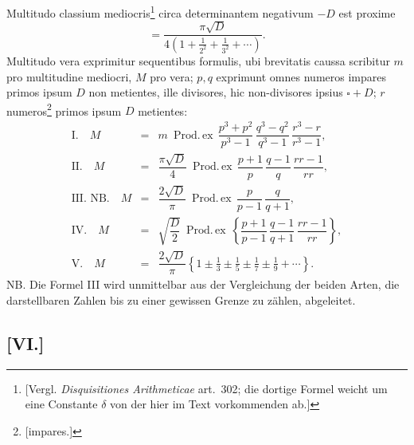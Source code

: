 \documentclass[12pt]{article}
\begin{document}
Multitudo classium mediocris\footnote{[Vergl. \emph{Disquisitiones Arithmeticae} art.~302; die dortige Formel weicht um eine Constante $\delta$ von der hier im Text vorkommenden ab.]} circa determinantem negativum $-D$ est proxime
\[
=\frac{\pi\sqrt D}{4\left(1+\frac1{2^2}+\frac1{3^2}+\cdots\right)}.
\]
Multitudo vera exprimitur sequentibus formulis, ubi brevitatis caussa scribitur $m$ pro multitudine mediocri, $M$ pro vera; $p,q$ exprimunt omnes numeros impares primos ipsum $D$ non metientes, ille divisores, hic non-divisores ipsius $\square+D$; $r$ numeros\footnote{[impares.]} primos ipsum $D$ metientes:
\[
\begin{array}{rcl}
\text{I.}\quad
M&=&m\ \mathop{\mathrm{Prod.\,ex}}\,
\dfrac{p^3+p^2}{p^3-1}\,
\dfrac{q^3-q^2}{q^3-1}\,
\dfrac{r^3-r}{r^3-1},
\\[3mm]
\text{II.}\quad
M&=&\dfrac{\pi\sqrt D}{4}\ \mathop{\mathrm{Prod.\,ex}}\,
\dfrac{p+1}{p}\,
\dfrac{q-1}{q}\,
\dfrac{rr-1}{rr},
\\[3mm]
\text{III. NB.}\quad
M&=&\dfrac{2\sqrt D}{\pi}\ \mathop{\mathrm{Prod.\,ex}}\,
\dfrac{p}{p-1}\,
\dfrac{q}{q+1},
\\[3mm]
\text{IV.}\quad
M&=&\sqrt{\dfrac{D}{2}}\ \mathop{\mathrm{Prod.\,ex}}\,
\left\{\dfrac{p+1}{p-1}\,
\dfrac{q-1}{q+1}\,
\dfrac{rr-1}{rr}\right\},
\\[3mm]
\text{V.}\quad
M&=&\dfrac{2\sqrt D}{\pi}
\left\{1\pm\frac13\pm\frac15\pm\frac17\pm\frac19+\cdots\right\}.
\end{array}
\]
NB. Die Formel III wird unmittelbar aus der Vergleichung der beiden Arten, die darstellbaren Zahlen bis zu einer gewissen Grenze zu zählen, abgeleitet.

\subsection*{[VI.]}
\end{document}
